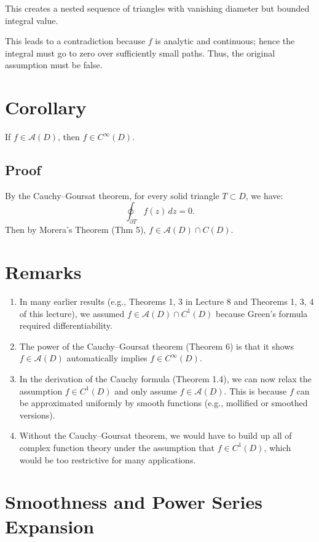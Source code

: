 \documentclass[12pt]{article}
\theoremstyle{definition} %
\theoremstyle{plain} %
\begin{document}
This creates a nested sequence of triangles with vanishing diameter but bounded integral value.

This leads to a contradiction because $f$ is analytic and continuous; hence the integral must go to zero over sufficiently small paths. Thus, the original assumption must be false.

\section*{Corollary}

If $f \in \mathcal{A}(D)$, then $f \in C^\infty(D)$.

\subsection*{Proof}

By the Cauchy–Goursat theorem, for every solid triangle $T \subset D$, we have:
\[
\oint_{\partial T} f(z)\,dz = 0.
\]
Then by Morera’s Theorem (Thm 5), $f \in \mathcal{A}(D) \cap C(D)$.

\section*{Remarks}

\begin{enumerate}
    \item In many earlier results (e.g., Theorems 1, 3 in Lecture 8 and Theorems 1, 3, 4 of this lecture), we assumed $f \in \mathcal{A}(D) \cap C^1(D)$ because Green’s formula required differentiability.

    \item The power of the Cauchy–Goursat theorem (Theorem 6) is that it shows $f \in \mathcal{A}(D)$ automatically implies $f \in C^\infty(D)$.

    \item In the derivation of the Cauchy formula (Theorem 1.4), we can now relax the assumption $f \in C^1(D)$ and only assume $f \in \mathcal{A}(D)$. This is because $f$ can be approximated uniformly by smooth functions (e.g., mollified or smoothed versions).

    \item Without the Cauchy–Goursat theorem, we would have to build up all of complex function theory under the assumption that $f \in C^1(D)$, which would be too restrictive for many applications.
\end{enumerate}


\section*{Smoothness and Power Series Expansion}
\end{document}
